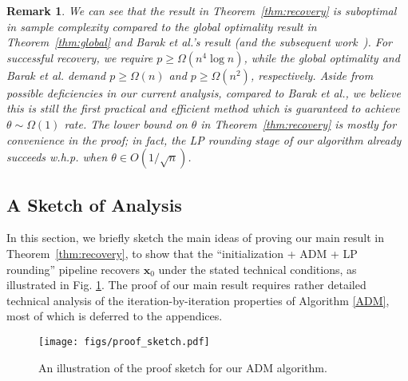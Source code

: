 \documentclass[11pt, journal, final]{IEEEtran}
\numberwithin{equation}{section}
\newtheorem{remark}[theorem]{Remark}
\newcommand{\mb}{\mathbf}
\newcommand{ \paren }[1]{ \left( #1 \right) }
\begin{document}
{\begin{remark}
We can see that the result in Theorem~\ref{thm:recovery} is suboptimal in sample complexity compared to the global optimality result in Theorem~\ref{thm:global} and Barak et al.'s result \cite{barak2013rounding} (and the subsequent work~\cite{hopkins2015speeding}). For successful recovery, we require $p \ge \Omega\paren{n^4 \log n}$, while the global optimality and Barak et al. demand $p \geq \Omega\paren{n}$ and $p \ge \Omega\paren{n^2}$, respectively. Aside from possible deficiencies in our current analysis, compared to Barak et al., we believe this is still the first practical and efficient method which is guaranteed to achieve $\theta\sim \Omega(1)$ rate. The lower bound on $\theta$ in Theorem~\ref{thm:recovery} is mostly for convenience in the proof; in fact, the LP rounding stage of our algorithm already succeeds w.h.p. when $\theta \in O\paren{ 1/\sqrt{n}}$.
\end{remark}

\subsection{A Sketch of Analysis} \label{sec:analysis_sketch}
In this section, we briefly sketch the main ideas of proving our main result in Theorem~\ref{thm:recovery}, to show that the ``initialization + ADM + LP rounding'' pipeline recovers $\mb x_0$ under the stated technical conditions, as illustrated in Fig. \ref{fig:proof_sketch}. The proof of our main result requires rather detailed technical analysis of the iteration-by-iteration properties of Algorithm \ref{ADM}, most of which is deferred to the appendices.

\begin{figure}[!htbp]
\begin{center}
\texttt{[image: figs/proof\_sketch.pdf]}
\end{center}
\caption{An illustration of the proof sketch for our ADM algorithm.}
\label{fig:proof_sketch}
\end{figure}

}
\end{document}

